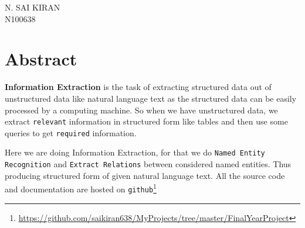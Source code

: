 \documentclass[12pt]{report}
\begin{document}
\begin{flushright}N. SAI KIRAN\\N100638\end{flushright}


\chapter*{Abstract}

\par \textbf{Information Extraction} is the task of extracting structured data out of unstructured
 data like natural language text as the structured data can be easily processed by a computing
  machine. So when we have unstructured data, we extract \texttt{relevant} information in structured form
   like tables and then use some queries to get \texttt{required} information.
\par Here we are doing Information Extraction, for that we do \texttt{Named Entity Recognition} and
 \texttt{Extract Relations} between considered named entities. Thus producing structured form of 
given natural language text. All the source code and documentation are hosted on \texttt{github}\footnote{\url{https://github.com/saikiran638/MyProjects/tree/master/FinalYearProject}}

\pagestyle{empty} %
\tableofcontents %
\cleardoublepage %
\pagestyle{plain} %
\setcounter{page}{1} %
\end{document}
